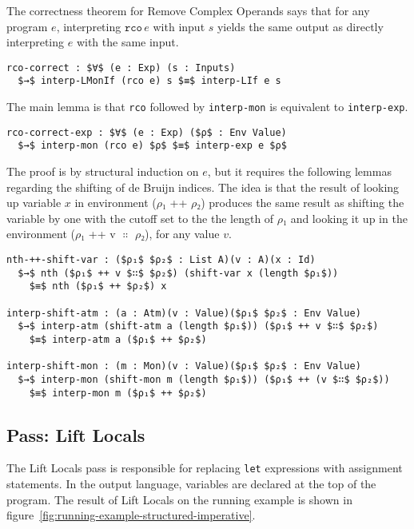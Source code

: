 \documentclass[sigplan,screen]{acmart}
\begin{document}
The correctness theorem for Remove Complex Operands says that for any
program $e$, interpreting $\mathtt{rco}\,e$ with input $s$ yields the
same output as directly interpreting $e$ with the same input.

\begin{lstlisting}
rco-correct : $∀$ (e : Exp) (s : Inputs)
  $→$ interp-LMonIf (rco e) s $≡$ interp-LIf e s 
\end{lstlisting}

The main lemma is that \lstinline{rco} followed by
\lstinline{interp-mon} is equivalent to \lstinline{interp-exp}.

\begin{lstlisting}
rco-correct-exp : $∀$ (e : Exp) ($ρ$ : Env Value)
  $→$ interp-mon (rco e) $ρ$ $≡$ interp-exp e $ρ$
\end{lstlisting}

The proof is by structural induction on $e$, but it requires the
following lemmas regarding the shifting of de Bruijn indices.
The idea is that the result of looking up variable $x$ in
environment ($ρ₁$ ++ $ρ₂$) produces the same result as
shifting the variable by one with the cutoff set to the
the length of $ρ₁$ and looking it up in the environment
($ρ₁$ ++ v $∷$ $ρ₂$), for any value $v$.

\begin{lstlisting}[basicstyle=\ttfamily\footnotesize]
nth-++-shift-var : ($ρ₁$ $ρ₂$ : List A)(v : A)(x : Id)
  $→$ nth ($ρ₁$ ++ v $∷$ $ρ₂$) (shift-var x (length $ρ₁$))
    $≡$ nth ($ρ₁$ ++ $ρ₂$) x

interp-shift-atm : (a : Atm)(v : Value)($ρ₁$ $ρ₂$ : Env Value)
  $→$ interp-atm (shift-atm a (length $ρ₁$)) ($ρ₁$ ++ v $∷$ $ρ₂$) 
    $≡$ interp-atm a ($ρ₁$ ++ $ρ₂$) 

interp-shift-mon : (m : Mon)(v : Value)($ρ₁$ $ρ₂$ : Env Value)
  $→$ interp-mon (shift-mon m (length $ρ₁$)) ($ρ₁$ ++ (v $∷$ $ρ₂$))
    $≡$ interp-mon m ($ρ₁$ ++ $ρ₂$)
\end{lstlisting}


\subsection{Pass: Lift Locals}

The Lift Locals pass is responsible for replacing \lstinline{let}
expressions with assignment statements. In the output language,
variables are declared at the top of the program.  The result of Lift
Locals on the running example is shown in
figure~\ref{fig:running-example-structured-imperative}.
\end{document}
